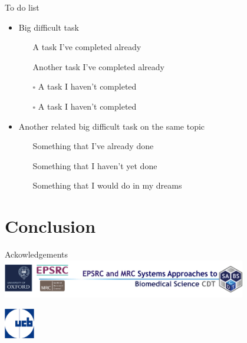 \documentclass{beamer}
\newcommand{\future}{\faStarO}
\newcommand{\cmark}{\ding{51}}%
\newcommand{\todo}{$\square$}{\raisebox{2pt}}
\newcommand{\done}{\rlap{$\square$}{\raisebox{2pt}{\large\hspace{1pt}\cmark}}%
    \hspace{-2.5pt}}
\begin{document}
\begin{frame}{To do list}
  \centering
  \begin{itemize}
      \setlength\itemsep{1.5em}
    \item Big difficult task 
    \begin{itemize}      \setlength\itemsep{1em}
      \item[\done] A task I've completed already  
      \item[\done] Another task I've completed already
      \item[\todo] A task I haven't completed 
      \item[\todo] A task I haven't completed 
    \end{itemize}
    \item Another related big difficult task on the same topic 
    \begin{itemize}      \setlength\itemsep{1em}
      \item[\done] Something that I've already done  
      \item[\done] Something that I haven't yet done 
      \item[\future] Something that I would do in my dreams 
    \end{itemize}
  \end{itemize}
\end{frame}

\section{Conclusion}

\begin{frame}{Ackowledgements}
\centering
\includegraphics[width=0.8\textwidth]{UpdatedSABSLogo1}

\includegraphics[width=0.1\textwidth]{UCB}\\
\end{frame}
\end{document}
